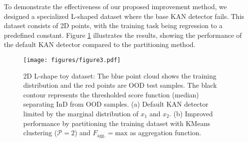 To demonstrate the effectiveness of our proposed improvement method, we designed a specialized L-shaped dataset where the base KAN detector fails. 
This dataset consists of 2D points, with the training task being regression to a predefined constant. 
Figure \ref{fig:joint_dist} illustrates the results, showing the performance of the default KAN detector compared to the partitioning method. 

\begin{figure}[ht]
\begin{center}
\texttt{[image: figures/figure3.pdf]}
\end{center}
\vspace{-5pt}
\caption{2D L-shape toy dataset: The blue point cloud shows the training distribution and the red points are OOD test samples. The black contour represents the thresholded score function (median) separating InD from OOD samples. 
(a) Default KAN detector limited by the marginal distribution of \(x_1\) and \(x_2\). 
(b) Improved performance by partitioning the training dataset with KMeans clustering ($\mathcal{P}=2$) and $F_{\text{agg.}}=\text{max}$ as aggregation function.}
\label{fig:joint_dist}
\end{figure}